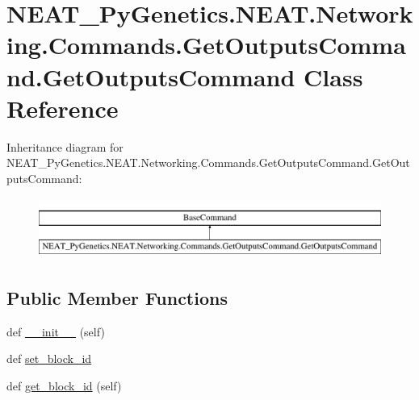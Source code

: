 \hypertarget{classNEAT__PyGenetics_1_1NEAT_1_1Networking_1_1Commands_1_1GetOutputsCommand_1_1GetOutputsCommand}{}\section{N\+E\+A\+T\+\_\+\+Py\+Genetics.\+N\+E\+A\+T.\+Networking.\+Commands.\+Get\+Outputs\+Command.\+Get\+Outputs\+Command Class Reference}
\label{classNEAT__PyGenetics_1_1NEAT_1_1Networking_1_1Commands_1_1GetOutputsCommand_1_1GetOutputsCommand}
Inheritance diagram for N\+E\+A\+T\+\_\+\+Py\+Genetics.\+N\+E\+A\+T.\+Networking.\+Commands.\+Get\+Outputs\+Command.\+Get\+Outputs\+Command\+:\begin{figure}[H]
\begin{center}
\leavevmode
\includegraphics[height=2.000000cm]{classNEAT__PyGenetics_1_1NEAT_1_1Networking_1_1Commands_1_1GetOutputsCommand_1_1GetOutputsCommand}
\end{center}
\end{figure}
\subsection*{Public Member Functions}
\begin{DoxyCompactItemize}
\item 
def \hyperlink{classNEAT__PyGenetics_1_1NEAT_1_1Networking_1_1Commands_1_1GetOutputsCommand_1_1GetOutputsCommand_a9cb7b34e60b60ab5b71843ba223ff626}{\+\_\+\+\_\+init\+\_\+\+\_\+} (self)
\item 
def \hyperlink{classNEAT__PyGenetics_1_1NEAT_1_1Networking_1_1Commands_1_1GetOutputsCommand_1_1GetOutputsCommand_a8ec7f2dc4780ec36b72c7fbff9492621}{set\+\_\+block\+\_\+id}
\item 
def \hyperlink{classNEAT__PyGenetics_1_1NEAT_1_1Networking_1_1Commands_1_1GetOutputsCommand_1_1GetOutputsCommand_af1c805c74a7c01ff8314f84f8461f25c}{get\+\_\+block\+\_\+id} (self)
\end{DoxyCompactItemize}


